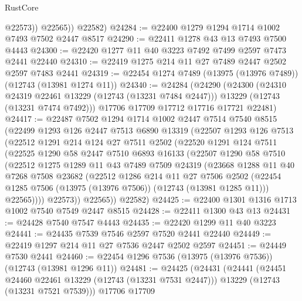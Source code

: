 \begin{lexlean}{RustCore}
\begin{coremodule}
              @22573))
          @22565))
      @22582)
@24284 := @22400 @1279 @1294 @1714 @1002 @7493 @7502 @2447 @8517
@24290 := @22411 @1278 @43 @13 @7493 @7500 @4443
@24300 := @22420 @1277 @11 @40 @3223 @7492 @7499 @2597 @7473 @2441 @22440
@24310 := @22419 @1275 @214 @11 @27 @7489 @2447 @2502 @2597 @7483 @2441
@24319 := @22454 @1274 @7489 (@13975 (@13976 @7489)) (@12743 (@13981 @1274 @11))
@24340 := @24284
    (@24290
      (@24300
        (@24310 @24319 @22461 @13229 (@12743 (@13231 @7484 @2447)))
        @13229
        (@12743 (@13231 @7474 @7492)))
      @17706
      @17709
      @17712
      @17716
      @17721
      @22481)
@24417 := @22487
    @7502
    @1294
    @1714
    @1002
    @2447
    @7514
    @7540
    @8515
    (@22499
      @1293
      @126
      @2447
      @7513
      @6890
      @13319
      (@22507
        @1293
        @126
        @7513
        (@22512
          @1291
          @214
          @124
          @27
          @7511
          @2502
          (@22520
            @1291
            @124
            @7511
            (@22525
              @1290
              @58
              @2447
              @7510
              @6893
              @16133
              (@22507
                @1290
                @58
                @7510
                (@22512
                  @1275
                  @1289
                  @11
                  @43
                  @7489
                  @7509
                  @24319
                  (@23668
                    @1288
                    @11
                    @40
                    @7268
                    @7508
                    @23682
                    (@22512
                      @1286
                      @214
                      @11
                      @27
                      @7506
                      @2502
                      (@22454 @1285 @7506 (@13975 (@13976 @7506)) (@12743 (@13981 @1285 @11)))
                      @22565))))
              @22573))
          @22565))
      @22582)
@24425 := @22400 @1301 @1316 @1713 @1002 @7540 @7549 @2447 @8515
@24428 := @22411 @1300 @43 @13
@24431 := @24428 @7540 @7547 @4443
@24435 := @22420 @1299 @11 @40 @3223
@24441 := @24435 @7539 @7546 @2597 @7520 @2441 @22440
@24449 := @22419 @1297 @214 @11 @27 @7536 @2447 @2502 @2597
@24451 := @24449 @7530 @2441
@24460 := @22454 @1296 @7536 (@13975 (@13976 @7536)) (@12743 (@13981 @1296 @11))
@24481 := @24425
    (@24431
      (@24441
        (@24451 @24460 @22461 @13229 (@12743 (@13231 @7531 @2447)))
        @13229
        (@12743 (@13231 @7521 @7539)))
      @17706
      @17709

\end{coremodule}
\end{lexlean}
